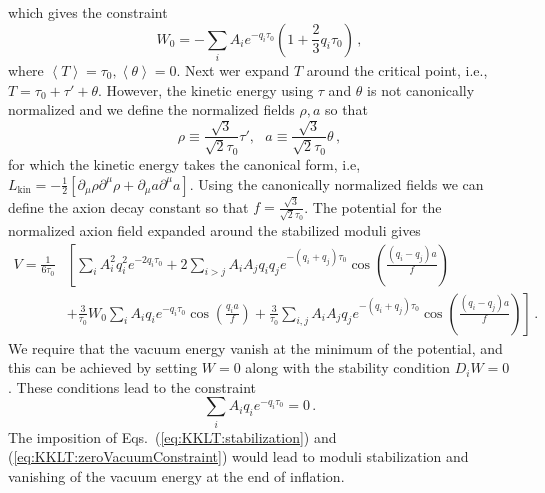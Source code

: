 \documentclass[12pt]{article}
\begin{document}
which gives the constraint
\begin{equation} \label{eq:KKLT:W0}
  W_0 = -\sum_i A_i e^{-q_i \tau_0} \left(1 + \frac{2}{3} q_i \tau_0\right)\,,
\end{equation}
where $\left<T\right> = \tau_0, \left<\theta\right> = 0$.
Next wer expand $T$ around the critical point, i.e., $T = \tau_0 + \tau' + \theta$.
However, the kinetic energy using $\tau$ and $\theta$ is not canonically normalized and we define the normalized fields $\rho, a$ so that
\begin{equation} \label{eq:KKLT:rho.a}
  \rho \equiv \frac{\sqrt 3}{\sqrt{2} \tau_0} \tau',
  ~~~ a \equiv \frac{\sqrt 3}{\sqrt{2} \tau_0} \theta\,,
\end{equation}
for which the kinetic energy takes the canonical form, i.e, $L_\text{kin} = -\frac{1}{2} \left[\partial_\mu \rho \partial^\mu \rho + \partial_\mu a \partial^\mu a\right]$.
Using the canonically normalized fields we can define the axion decay constant so that $f = \frac{\sqrt 3}{\sqrt{2} \tau_0}$.
The potential for the normalized axion field expanded around the stabilized moduli gives
\begin{equation} \label{eq:KKLT:Vslow}
  \begin{aligned}
    V = \frac{1}{6 \tau_0} &\left[
        \sum_i A^2_i q^2_i e^{-2 q_i \tau_0}
      + 2 \sum_{i > j} A_i A_j q_i q_j e^{-\left(q_i + q_j\right)\tau_0}
        \cos\left(\frac{\left(q_i - q_j\right) a}{f}\right)\right.\\
    &{}\left. + \frac{3}{\tau_0} W_0 \sum_i A_i q_i e^{-q_i \tau_0}
        \cos\left(\frac{q_i a}{f}\right)
      + \frac{3}{\tau_0} \sum_{i, j} A_i A_j q_j e^{-\left(q_i + q_j\right) \tau_0}
        \cos\left(\frac{\left(q_i - q_j\right) a}{f}\right)
    \right]\,.
  \end{aligned}
\end{equation}
We require that the vacuum energy vanish at the minimum of the potential, and this can be achieved by setting $W = 0$ along with the stability condition $D_i W = 0$.
These conditions lead to the constraint
\begin{equation} \label{eq:KKLT:zeroVacuumConstraint}
  \sum_i A_i q_i e^{-q_i \tau_0} = 0\,.
\end{equation}
The imposition of Eqs.~(\ref{eq:KKLT:stabilization}) and (\ref{eq:KKLT:zeroVacuumConstraint}) would lead to moduli stabilization and vanishing of the vacuum energy at the end of inflation.

\end{document}
